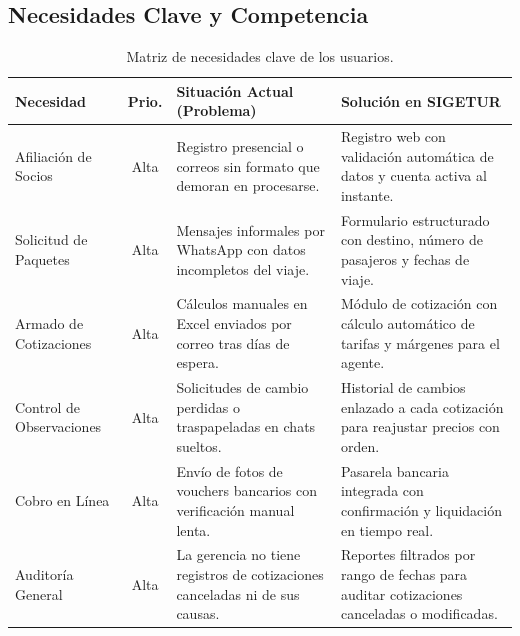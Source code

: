 \subsection{Necesidades Clave y Competencia}
\begin{table}[H]
\centering
\scriptsize
\begin{tabularx}{\textwidth}{lcLL}
\toprule
\textbf{Necesidad} & \textbf{Prio.} & \textbf{Situación Actual (Problema)} & \textbf{Solución en SIGETUR} \\
\midrule
Afiliación de Socios & Alta & Registro presencial o correos sin formato que demoran en procesarse. & Registro web con validación automática de datos y cuenta activa al instante. \\
Solicitud de Paquetes & Alta & Mensajes informales por WhatsApp con datos incompletos del viaje. & Formulario estructurado con destino, número de pasajeros y fechas de viaje. \\
Armado de Cotizaciones & Alta & Cálculos manuales en Excel enviados por correo tras días de espera. & Módulo de cotización con cálculo automático de tarifas y márgenes para el agente. \\
Control de Observaciones & Alta & Solicitudes de cambio perdidas o traspapeladas en chats sueltos. & Historial de cambios enlazado a cada cotización para reajustar precios con orden. \\
Cobro en Línea & Alta & Envío de fotos de vouchers bancarios con verificación manual lenta. & Pasarela bancaria integrada con confirmación y liquidación en tiempo real. \\
Auditoría General & Alta & La gerencia no tiene registros de cotizaciones canceladas ni de sus causas. & Reportes filtrados por rango de fechas para auditar cotizaciones canceladas o modificadas. \\
\bottomrule
\end{tabularx}
\caption{Matriz de necesidades clave de los usuarios.}\label{tab:necesidades}
\end{table}
